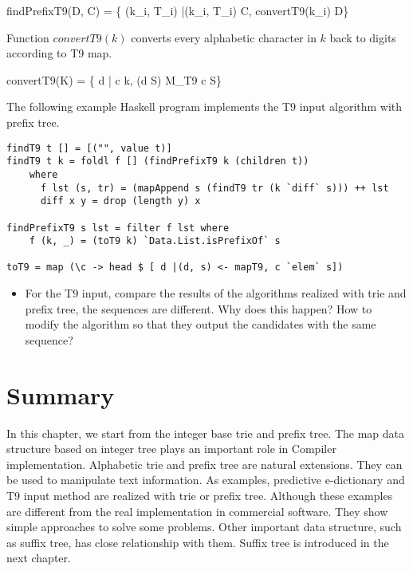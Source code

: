 \documentclass{article}
\begin{document}
\be
findPrefixT9(D, C) = \{ (k_i, T_i) |(k_i, T_i) \in C, convertT9(k_i) \sqsubset D\}
\ee

Function $convertT9(k)$ converts every alphabetic character in $k$ back
to digits according to T9 map.

\be
convertT9(K) = \{ d | \forall c \in k, \exists (d \rightarrow S) \in M_{T9} \Rightarrow c \in S\}
\ee

The following example Haskell program implements the T9 input algorithm
with prefix tree.

\begin{lstlisting}
findT9 t [] = [("", value t)]
findT9 t k = foldl f [] (findPrefixT9 k (children t))
    where
      f lst (s, tr) = (mapAppend s (findT9 tr (k `diff` s))) ++ lst
      diff x y = drop (length y) x

findPrefixT9 s lst = filter f lst where
    f (k, _) = (toT9 k) `Data.List.isPrefixOf` s

toT9 = map (\c -> head $ [ d |(d, s) <- mapT9, c `elem` s])
\end{lstlisting}

\begin{Exercise}
\begin{itemize}
\item For the T9 input, compare the results of the algorithms realized with trie and prefix tree,
the sequences are different. Why does this happen? How to modify the algorithm so that they
output the candidates with the same sequence?
\end{itemize}
\end{Exercise}

\section{Summary}

In this chapter, we start from the integer base trie and prefix tree. The
map data structure based on integer tree plays an important role
in Compiler implementation. Alphabetic trie and prefix tree are
natural extensions. They can be used to manipulate text information.
As examples, predictive e-dictionary and T9 input method are
realized with trie or prefix tree. Although these examples
are different from the real implementation in commercial software.
They show simple approaches to solve some problems.
Other important data structure, such as suffix tree, has close
relationship with them. Suffix tree is introduced in the next chapter.
\end{document}
